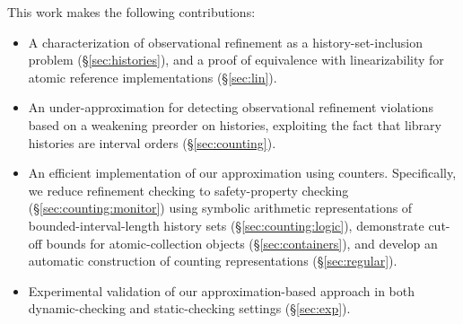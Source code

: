 This work makes the following contributions:
\begin{itemize}

  \item A characterization of observational refinement as a
  history-set-inclusion problem (\S\ref{sec:histories}), and a proof of
  equivalence with linearizability for atomic reference implementations
  (\S\ref{sec:lin}).

  \item An under-approximation for detecting observational refinement
  violations based on a weakening preorder on histories, exploiting the fact
  that library histories are interval orders (\S\ref{sec:counting}).

  \item An efficient implementation of our approximation using counters.
  Specifically, we reduce refinement checking to safety-property checking
  (\S\ref{sec:counting:monitor}) using symbolic arithmetic representations of
  bounded-interval-length history sets (\S\ref{sec:counting:logic}),
  demonstrate cut-off bounds for atomic-collection objects
  (\S\ref{sec:containers}), and develop an automatic construction of counting
  representations (\S\ref{sec:regular}).

  \item Experimental validation of our approximation-based approach in both
  dynamic-checking and static-checking settings (\S\ref{sec:exp}).

\end{itemize}
